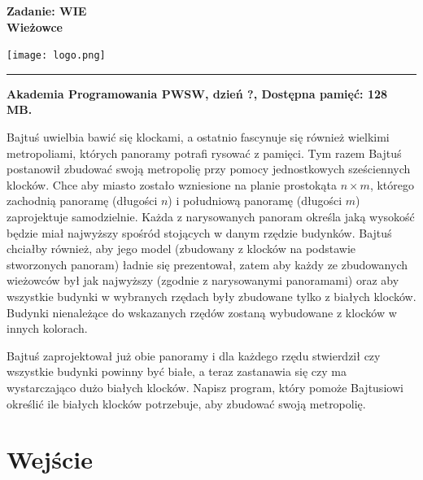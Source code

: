 \documentclass[10pt]{article}
\begin{document}
    

    \noindent
    \begin{minipage}{0.5\textwidth}
        \LARGE{\textsf{\textbf{Zadanie: WIE\\Wieżowce}}}
    \end{minipage}
    \begin{minipage}{0.5\textwidth}
        \begin{flushright}
            \texttt{[image: logo.png]}
        \end{flushright}
    \end{minipage}
    
    \noindent\rule{\textwidth}{0.4pt}
    
    \noindent\textbf{Akademia Programowania PWSW, dzień ?, Dostępna pamięć: 128 MB.}
    \vspace{1em}
    
    
    \noindent
    Bajtuś uwielbia bawić się klockami, a ostatnio fascynuje się również wielkimi metropoliami, których panoramy potrafi rysować z pamięci. Tym razem Bajtuś postanowił zbudować swoją metropolię przy pomocy jednostkowych sześciennych klocków. Chce aby miasto zostało wzniesione na planie prostokąta $n\times m$, którego zachodnią panoramę (długości $n$) i południową panoramę (długości $m$) zaprojektuje samodzielnie. Każda z narysowanych panoram określa jaką wysokość będzie miał najwyższy spośród stojących w danym rzędzie budynków. Bajtuś chciałby również, aby jego model (zbudowany z klocków na podstawie stworzonych panoram) ładnie się prezentował, zatem aby każdy ze zbudowanych wieżowców był jak najwyższy (zgodnie z narysowanymi panoramami) oraz aby wszystkie budynki w wybranych rzędach były zbudowane tylko z białych klocków. Budynki nienależące do wskazanych rzędów zostaną wybudowane z klocków w innych kolorach.
    
    Bajtuś zaprojektował już obie panoramy i dla każdego rzędu stwierdził czy wszystkie budynki powinny być białe, a teraz zastanawia się czy ma wystarczająco dużo białych klocków. Napisz program, który pomoże Bajtusiowi określić ile białych klocków potrzebuje, aby zbudować swoją metropolię.


    \section*{Wejście}
    
\end{document}
